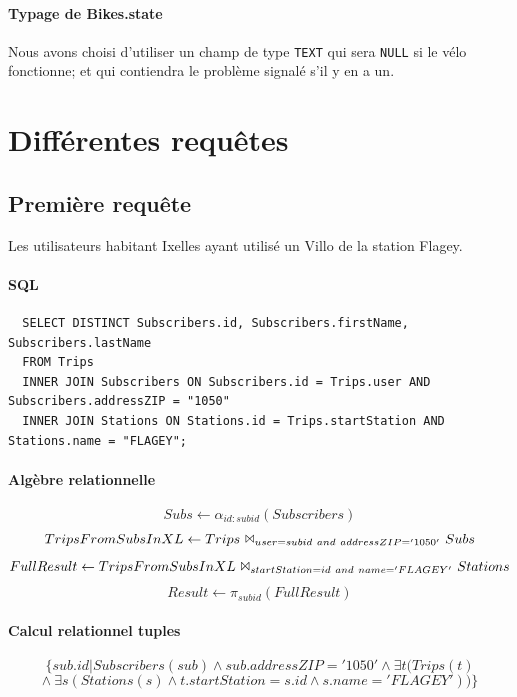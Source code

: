 \documentclass[a4paper]{article}
\begin{document}
  \paragraph{Typage de Bikes.state} Nous avons choisi d'utiliser un champ de type \texttt{TEXT} qui sera \texttt{NULL} si le vélo fonctionne; et qui contiendra le problème signalé s'il y en a un.

\section{Différentes requêtes}



\subsection{Première requête}
    Les utilisateurs habitant Ixelles ayant utilisé un Villo de la station Flagey.

    \paragraph{SQL}
  \begin{verbatim}
  SELECT DISTINCT Subscribers.id, Subscribers.firstName, Subscribers.lastName
  FROM Trips
  INNER JOIN Subscribers ON Subscribers.id = Trips.user AND Subscribers.addressZIP = "1050"
  INNER JOIN Stations ON Stations.id = Trips.startStation AND Stations.name = "FLAGEY";
  \end{verbatim}
  
    \paragraph{Algèbre relationnelle}
    $$ Subs \leftarrow \alpha_{id:subid}(Subscribers)$$
    $$TripsFromSubsInXL \leftarrow Trips\ \Bowtie_{user=subid\ and\ addressZIP='1050'}\ Subs$$
    $$FullResult \leftarrow TripsFromSubsInXL\ \Bowtie_{startStation=id\ and\  name='FLAGEY'}\ Stations$$
    $$Result \leftarrow \pi_{subid}(FullResult)$$
    
    \paragraph{Calcul relationnel tuples}
    $$ \{sub.id | Subscribers(sub) \land sub.addressZIP='1050' \land \exists t (Trips(t)$$
    $$ \land\ \exists s (Stations(s) \land t.startStation=s.id \land s.name = 'FLAGEY'))  \} $$
\end{document}

